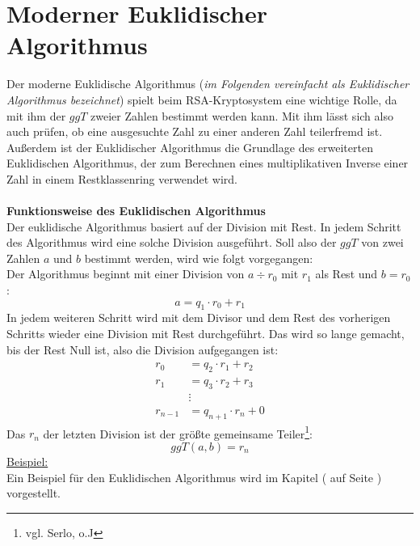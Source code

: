 \section{Moderner Euklidischer Algorithmus}
\label{sec:Euklid_Algorithm}
Der moderne Euklidische Algorithmus (\textit{im Folgenden vereinfacht als Euklidischer Algorithmus bezeichnet}) spielt beim RSA-Kryptosystem eine wichtige Rolle, da mit ihm der $ggT$ zweier Zahlen bestimmt werden kann. Mit ihm lässt sich also auch prüfen, ob eine ausgesuchte Zahl zu einer anderen Zahl teilerfremd ist. Außerdem ist der Euklidischer Algorithmus die Grundlage des erweiterten Euklidischen Algorithmus, der zum Berechnen eines multiplikativen Inverse einer Zahl in einem Restklassenring verwendet wird.\\
\\
\textbf{Funktionsweise des Euklidischen Algorithmus}\\
Der euklidische Algorithmus basiert auf der Division mit Rest. In jedem Schritt des Algorithmus wird eine solche Division ausgeführt.
Soll also der $ggT$ von zwei Zahlen $a$ und $b$ bestimmt werden, wird wie folgt vorgegangen:\\
Der Algorithmus beginnt mit einer Division von  $a\div r_{0}$ mit $r_1$ als Rest und $b=r_{0}$:
\begin{equation*}
a=q_1\cdot r_0 + r_1
\end{equation*}
In jedem weiteren Schritt wird mit dem Divisor und dem Rest des vorherigen Schritts wieder eine Division mit Rest durchgeführt. Das wird so lange gemacht, bis der Rest Null ist, also die Division aufgegangen ist:
\begin{align*}
r_0 &= q_2\cdot r_1 + r_2\\
r_1 &= q_3\cdot r_2 + r_3\\
&\vdots\\
r_{n-1} &= q_{n+1}\cdot r_n + 0
\end{align*}
Das $r_n$ der letzten Division ist der größte gemeinsame Teiler\footnote{vgl. Serlo, o.J}:
\begin{equation*}
ggT(a,b)=r_n
\end{equation*}
\underline{Beispiel:}\\
Ein Beispiel für den Euklidischen Algorithmus wird im Kapitel (\textit{} auf Seite \pageref{euklid_beispiel}) vorgestellt.
